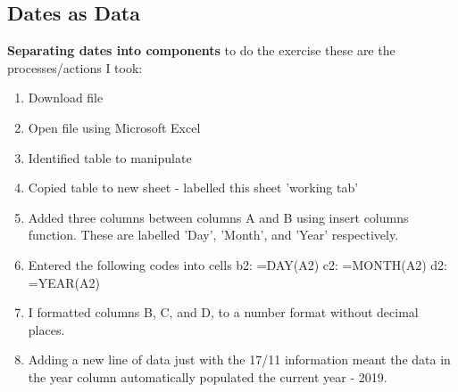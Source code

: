 \documentclass{article}
\begin{document}
\subsection{Dates as Data}
\textbf{Separating dates into components}
to do the exercise these are the processes/actions I took:
\begin{enumerate}
    \item Download file
    \item Open file using Microsoft Excel
    \item Identified table to manipulate
    \item Copied table to new sheet - labelled this sheet 'working tab'
    \item Added three columns between columns A and B using insert columns function. These are labelled 'Day', 'Month', and 'Year' respectively.
    \item Entered the following codes into cells b2: =DAY(A2) c2: =MONTH(A2) d2: =YEAR(A2)
    \item I formatted columns B, C, and D, to a number format without decimal places. 
    \item Adding a new line of data just with the 17/11 information meant the data in the year column automatically populated the current year - 2019. 
\end{enumerate}
\end{document}
